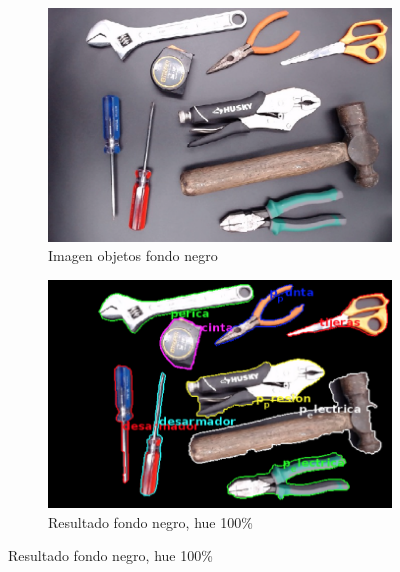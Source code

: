 \documentclass[a4paper, 11pt]{article}
\begin{document}
\begin{figure}[h]
  \centering
  \begin{subfigure}{0.5\linewidth}
    \includegraphics[width=\linewidth]{resultados_colores/todo_negro}
    \caption{Imagen objetos fondo negro}
    \label{fig:1a}
  \end{subfigure}\hfill
  \begin{subfigure}{0.5\linewidth}
    \includegraphics[width=\linewidth]{resultados_colores/resultado_negro_hue_1}
    \caption{Resultado fondo negro, hue 100\%}
    \label{fig:1a}
  \end{subfigure}
  

\end{figure}
\end{document}

